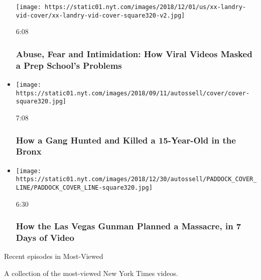 \begin{itemize}
  \texttt{[image: https://static01.nyt.com/images/2018/12/01/us/xx-landry-vid-cover/xx-landry-vid-cover-square320-v2.jpg]}

  6:08

  \hypertarget{abuse-fear-and-intimidation-how-viral-videos-masked-a-prep-schools-problems}{%
  \subsubsection{Abuse, Fear and Intimidation: How Viral Videos Masked a
  Prep School's
  Problems}\label{abuse-fear-and-intimidation-how-viral-videos-masked-a-prep-schools-problems}}
\item
  \href{https://www.nytimes.com/video/nyregion/100000005990101/junior-murder-bronx-trinitarios.html?action=click\&module=video-series-bar\&region=header\&pgtype=Article\&playlistId=video/Most-Viewed}{}

  \texttt{[image: https://static01.nyt.com/images/2018/09/11/autossell/cover/cover-square320.jpg]}

  7:08

  \hypertarget{how-a-gang-hunted-and-killed-a-15-year-old-in-the-bronx}{%
  \subsubsection{How a Gang Hunted and Killed a 15-Year-Old in the
  Bronx}\label{how-a-gang-hunted-and-killed-a-15-year-old-in-the-bronx}}
\item
  \href{https://www.nytimes.com/video/us/100000005794914/las-vegas-gunman-planned-massacre.html?action=click\&module=video-series-bar\&region=header\&pgtype=Article\&playlistId=video/Most-Viewed}{}

  \texttt{[image: https://static01.nyt.com/images/2018/12/30/autossell/PADDOCK\_COVER\_LINE/PADDOCK\_COVER\_LINE-square320.jpg]}

  6:30

  \hypertarget{how-the-las-vegas-gunman-planned-a-massacre-in-7-days-of-video}{%
  \subsubsection{How the Las Vegas Gunman Planned a Massacre, in 7 Days
  of
  Video}\label{how-the-las-vegas-gunman-planned-a-massacre-in-7-days-of-video}}
\end{itemize}

Recent episodes in Most-Viewed

A collection of the most-viewed New York Times videos.

